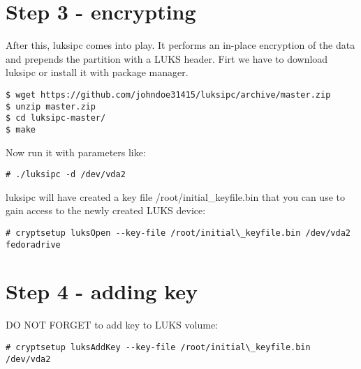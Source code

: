 \section{Step 3 - encrypting}
After this, luksipc comes into play. It performs an in-place encryption of the data and prepends the partition with a LUKS header. Firt we have to download luksipc or install it with package manager.
\begin{lstlisting}[columns=fixed,basicstyle=\ttfamily\footnotesize,tabsize=4,backgroundcolor=\color{yellow!10}]
$ wget https://github.com/johndoe31415/luksipc/archive/master.zip
$ unzip master.zip
$ cd luksipc-master/
$ make
\end{lstlisting}
Now run it with parameters like:
\begin{lstlisting}[columns=fixed,basicstyle=\ttfamily\footnotesize,tabsize=4,backgroundcolor=\color{yellow!10}]
# ./luksipc -d /dev/vda2
\end{lstlisting}
luksipc will have created a key file /root/initial\_keyfile.bin that you can use to gain access to the newly created LUKS device:
\begin{lstlisting}[columns=fixed,basicstyle=\ttfamily\footnotesize,tabsize=4,backgroundcolor=\color{yellow!10}]
# cryptsetup luksOpen --key-file /root/initial\_keyfile.bin /dev/vda2 fedoradrive
\end{lstlisting}



\section{Step 4 - adding key}
DO NOT FORGET to add key to LUKS volume:
\begin{lstlisting}[columns=fixed,basicstyle=\ttfamily\footnotesize,tabsize=4,backgroundcolor=\color{yellow!10}]
# cryptsetup luksAddKey --key-file /root/initial\_keyfile.bin /dev/vda2
\end{lstlisting}
